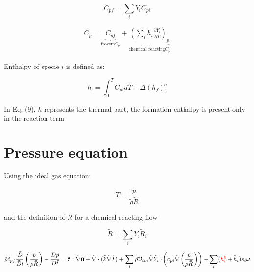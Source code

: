 \documentclass[preprint,12pt,authoryear]{elsarticle}
\begin{document}
\begin{equation}
C_{pf}=\sum_iY_iC_{pi}
\end{equation}

\begin{equation}
\begin{split}
C_p
=
\underbrace{
C_{pf}
	    }_{\text{frozem}C_p}
+
\underbrace{
		\left(\sum_i h_i\frac{\partial{Y_i}}{\partial{T}}\right)_p
}_{\text{chemical reacting} C_p}
\end{split}
\end{equation}


Enthalpy of specie $i$ is defined as:

\begin{equation}
	h_i=\int_0^TC_{pi}dT+\Delta(h_f)_i^o
\end{equation}


{\color{red}
In Eq. (9), $h$ represents the thermal part, the formation enthalpy is present only in the reaction term 
}


\section{Pressure equation}


Using the ideal gas equation:

\begin{equation}
        \tilde{T}=\frac{\tilde{p}}{\tilde{\rho}\tilde{R}}
\end{equation}

and the definition of $R$ for a chemical reacting flow 

\begin{equation}
	\tilde{R}=\sum_iY_i\tilde{R}_i
\end{equation}

\begin{equation}
\begin{split}
        \tilde{\rho}
        \tilde{c}_{pf}
        \frac{\tilde{D}}{\tilde{D} t}
        \left(
                \frac{\tilde{p}}{\tilde{\rho}\tilde{R}}
        \right)
        -
        \frac{D \tilde{p}}{D\tilde{t}}
        =
        \pmb{\tilde{\tau}}:\tilde{\nabla} \tilde{\mathbf{u}} 
        + 
        \tilde{\nabla} \cdot (\tilde{k}\tilde{\nabla} \tilde{T})
        +
        \sum\limits_i 
        \tilde{\rho}
        \mathcal{D}_{im}
        \tilde{\nabla}
        \tilde{Y}_i     
        \cdot
        \left(
                c_{pi}
                \tilde{\nabla}
                \left(
                	\frac{\tilde{p}}{\tilde{\rho}\tilde{R}}
        	\right)
        \right)
        -
        \sum\limits_i
        ({\color{red} h_i^0} + \tilde{h}_i)
        s_i	
        \omega
\end{split}
\end{equation}
\end{document}
